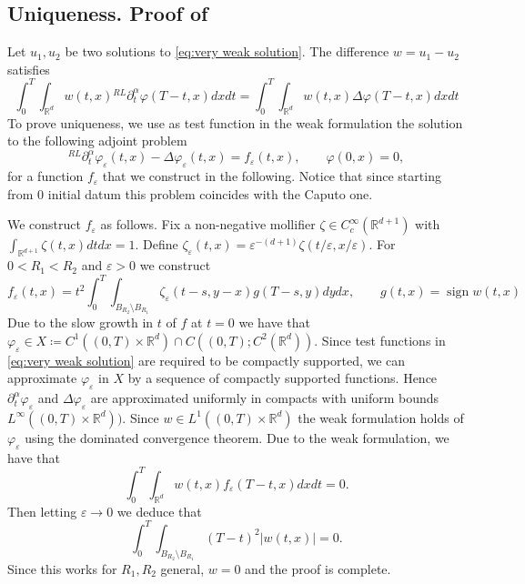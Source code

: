\documentclass[a4paper]{article}
\theoremstyle{definition}
\newcommand{\Rd}{{\mathbb{R}^d}}
\newcommand{\dRL}{{^{RL}\partial_t^\alpha}}
\begin{document}
\subsection{Uniqueness. Proof of }
Let $u_1, u_2$ be two solutions to \eqref{eq:very weak solution}.
The difference $w = u_1 - u_2$ satisfies
\begin{equation*}
  \int_{0}^T  \int_{\Rd} w(t,x) \dRL \varphi(T-t,x)dxdt
  = \int_0^T \int_{\Rd} w(t,x) \Delta\varphi(T-t,x)  dx dt
\end{equation*}
To prove uniqueness, we use as test function in the weak formulation the solution to the following adjoint problem
\begin{equation*}
  \dRL \varphi_\varepsilon(t,x) - \Delta \varphi_\varepsilon(t,x) = f_\varepsilon(t,x) , \qquad \varphi(0,x) = 0,
\end{equation*}
for a function $f_\varepsilon$ that we construct in the following. Notice that since starting from $0$ initial datum this problem coincides with the Caputo one.

We construct $f_\varepsilon$ as follows. Fix a non-negative mollifier $\zeta \in C^\infty_c (\mathbb R^{d+1})$ with $\int_{\mathbb R^{d+1}} \zeta(t,x) dt dx = 1$. Define $\zeta_\varepsilon(t,x) = \varepsilon^{-(d+1)} \zeta( t / \varepsilon , x / \varepsilon)$.
For $0 < R_1 < R_2$ and $\varepsilon > 0$ we construct
\begin{equation*}
  f_\varepsilon(t,x) = t^2 \int_{0}^T \int_{B_{R_2} \setminus B_{R_1}} \zeta_\varepsilon(t-s,y-x) g(T-s,y) dy dx, \qquad g(t,x) =  \operatorname{sign} w(t,x)
\end{equation*}
Due to the slow growth in $t$ of $f$ at $t = 0$ we have that $\varphi_\varepsilon \in X \coloneqq C^1((0,T) \times \mathbb R^d) \cap C((0,T); C^2(\mathbb R^d))$. Since test functions in \eqref{eq:very weak solution} are required to be compactly supported, we can approximate $\varphi_\varepsilon$ in $X$  by a sequence of compactly supported functions. Hence $\partial_t^\alpha \varphi_\varepsilon$ and $\Delta \varphi_\varepsilon$ are approximated uniformly in compacts with uniform bounds $L^\infty((0,T) \times \mathbb R^d))$. Since $w \in L^1((0,T) \times \mathbb R^d)$ the weak formulation holds of $\varphi_\varepsilon$ using the dominated convergence theorem. Due to the weak formulation, we have that
\begin{equation*}
\int_0^T \int_{\mathbb R^d} w(t,x) f_\varepsilon(T-t,x) dx dt = 0.
\end{equation*}
Then letting $\varepsilon \to 0$
we deduce that
\begin{equation*}
\int_0^T \int_{B_{R_2} \setminus B_{R_1}} (T-t)^2 |w(t,x)| = 0.
\end{equation*}
Since this works for $R_1, R_2$ general, $w = 0$ and the proof is complete.
\end{document}
